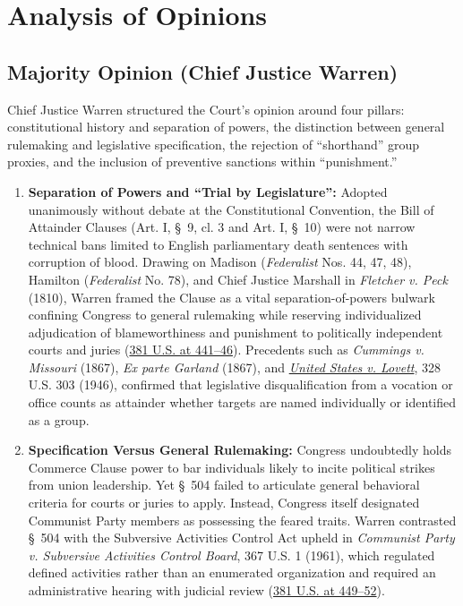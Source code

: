 \documentclass[12pt]{article}
\begin{document}
\section{Analysis of Opinions}
\subsection{Majority Opinion (Chief Justice Warren)}

Chief Justice Warren structured the Court's opinion around four pillars: constitutional history and separation of powers, the distinction between general rulemaking and legislative specification, the rejection of ``shorthand'' group proxies, and the inclusion of preventive sanctions within ``punishment.''

\begin{enumerate}
  \item \textbf{Separation of Powers and ``Trial by Legislature'':} Adopted unanimously without debate at the Constitutional Convention, the Bill of Attainder Clauses (Art. I, \S~9, cl. 3 and Art. I, \S~10) were not narrow technical bans limited to English parliamentary death sentences with corruption of blood. Drawing on Madison (\textit{Federalist} Nos. 44, 47, 48), Hamilton (\textit{Federalist} No. 78), and Chief Justice Marshall in \textit{Fletcher v. Peck} (1810), Warren framed the Clause as a vital separation-of-powers bulwark confining Congress to general rulemaking while reserving individualized adjudication of blameworthiness and punishment to politically independent courts and juries (\href{https://supreme.justia.com/cases/federal/us/381/437/}{381 U.S. at 441--46}). Precedents such as \textit{Cummings v. Missouri} (1867), \textit{Ex parte Garland} (1867), and \href{https://supreme.justia.com/cases/federal/us/328/303/}{\textit{United States v. Lovett}}, 328 U.S. 303 (1946), confirmed that legislative disqualification from a vocation or office counts as attainder whether targets are named individually or identified as a group.

  \item \textbf{Specification Versus General Rulemaking:} Congress undoubtedly holds Commerce Clause power to bar individuals likely to incite political strikes from union leadership. Yet \S~504 failed to articulate general behavioral criteria for courts or juries to apply. Instead, Congress itself designated Communist Party members as possessing the feared traits. Warren contrasted \S~504 with the Subversive Activities Control Act upheld in \textit{Communist Party v. Subversive Activities Control Board}, 367 U.S. 1 (1961), which regulated defined activities rather than an enumerated organization and required an administrative hearing with judicial review (\href{https://www.law.cornell.edu/supremecourt/text/381/437}{381 U.S. at 449--52}).


\end{enumerate}
\end{document}
